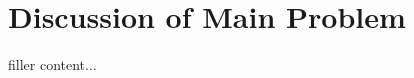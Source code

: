 \documentclass[../../templates/section]{subfiles}
\begin{document}
\section{Discussion of Main Problem}\label{sec:discussion-of-main-problem}

filler content...
\end{document}
